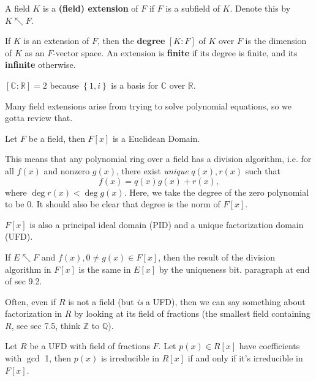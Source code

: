 \documentclass[10pt]{report}
\begin{document}
\tableofcontents

\begin{defn}[]
	A field $K$ is a \textbf{(field) extension} of $F$ if $F$ is a subfield of $K$. Denote this by $K\nwarrow F$.
\end{defn}

\begin{defn}
	If $K$ is an extension of $F$, then the \textbf{degree} $[K:F]$ of $K$ over $F$ is the dimension of $K$ as an $F$-vector space. An extension is \textbf{finite} if its degree is finite, and its \textbf{infinite} otherwise.
\end{defn}

\begin{ex}[]
	$[\mathbb{C}:\mathbb{R}]=2$ because $\left\{ 1,i \right\}$ is a basis for $\mathbb{C}$ over $\mathbb{R}$.
\end{ex}

Many field extensions arise from trying to solve polynomial equations, so we gotta review that.

\begin{thrm}[]
	Let $F$ be a field, then $F[x]$ is a Euclidean Domain.
\end{thrm}

This means that any polynomial ring over a field has a division algorithm, i.e. for all $f(x)$ and nonzero $g(x)$, there exist \textit{unique} $q(x), r(x)$ such that
\[
	f(x)=q(x)g(x)+r(x),
\] where $\deg r(x) < \deg g(x)$. Here, we take the degree of the zero polynomial to be 0. It should also be clear that degree is the norm of $F[x]$.

\begin{cor}
	$F[x]$ is also a principal ideal domain (PID) and a unique factorization domain (UFD).
\end{cor}

If $E \nwarrow F$ and $f(x), 0 \neq g(x) \in F[x]$, then the result of the division algorithm in $F[x]$ is the same in $E[x]$ by the uniqueness bit. {\color{red}paragraph at end of sec 9.2.}

Often, even if $R$ is not a field (but \textit{is} a UFD), then we can say something about factorization in $R$ by looking at its field of fractions {\color{red}(the smallest field containing $R$, see sec 7.5, think $\mathbb{Z}$ to $\mathbb{Q}$).}

\begin{lem}
	Let $R$ be a UFD with field of fractions $F$. Let $p(x) \in R[x]$ have coefficients with $\gcd$ 1, then $p(x)$ is irreducible in $R[x]$ if and only if it's irreducible in $F[x]$.
\end{lem}
\end{document}
